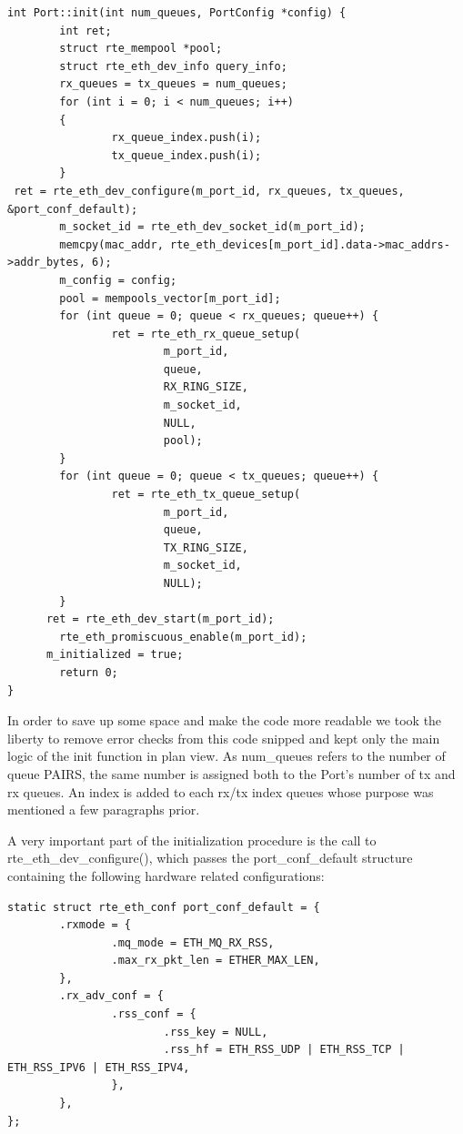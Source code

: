 \documentclass[a4paper,12p,titlepage]{article}
\begin{document}
\begin{frame}

\lstset{language=C++,breaklines=true,numbers=left}
\begin{lstlisting}
int Port::init(int num_queues, PortConfig *config) {
        int ret;
        struct rte_mempool *pool;
        struct rte_eth_dev_info query_info;
        rx_queues = tx_queues = num_queues;
        for (int i = 0; i < num_queues; i++)
        {
                rx_queue_index.push(i);
                tx_queue_index.push(i);
        }
 ret = rte_eth_dev_configure(m_port_id, rx_queues, tx_queues,
&port_conf_default);
        m_socket_id = rte_eth_dev_socket_id(m_port_id);
        memcpy(mac_addr, rte_eth_devices[m_port_id].data->mac_addrs->addr_bytes, 6);
        m_config = config;
        pool = mempools_vector[m_port_id];
        for (int queue = 0; queue < rx_queues; queue++) {
                ret = rte_eth_rx_queue_setup(
                        m_port_id,
                        queue,
                        RX_RING_SIZE,
                        m_socket_id,
                        NULL,
                        pool);
        }
        for (int queue = 0; queue < tx_queues; queue++) {
                ret = rte_eth_tx_queue_setup(
                        m_port_id,
                        queue,
                        TX_RING_SIZE,
                        m_socket_id,
                        NULL);
        }
	  ret = rte_eth_dev_start(m_port_id);
        rte_eth_promiscuous_enable(m_port_id);
	  m_initialized = true;
        return 0;
}
\end{lstlisting}
\end{frame}

In order to save up some space and make the code more readable we took the liberty to remove error checks from this code snipped and kept only the main logic of the init function in plan view. As num\_queues refers to the number of queue PAIRS, the same number is assigned both to the Port’s number of tx and rx queues. An index is added to each rx/tx index queues whose purpose was mentioned a few paragraphs prior.

A very important part of the initialization procedure is the call to rte\_eth\_dev\_configure(), which passes the port\_conf\_default structure containing the following hardware related configurations:

\begin{frame}

\lstset{language=C++,breaklines=true,numbers=left}
\begin{lstlisting}
static struct rte_eth_conf port_conf_default = {
        .rxmode = {
                .mq_mode = ETH_MQ_RX_RSS,
                .max_rx_pkt_len = ETHER_MAX_LEN,
        },
        .rx_adv_conf = {
                .rss_conf = {
                        .rss_key = NULL,
                        .rss_hf = ETH_RSS_UDP | ETH_RSS_TCP | ETH_RSS_IPV6 | ETH_RSS_IPV4,
                },
        },
};
\end{lstlisting}
\end{frame}
\end{document}
